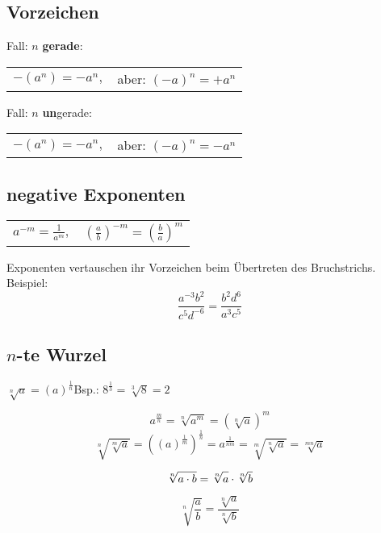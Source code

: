 \begin{multicols}{2}
\subsection*{Vorzeichen}
Fall: $n$ \textbf{gerade}:

\begin{tabular}{cc}
 $-(a^n) = -a^n,$ & aber: $(-a)^n = +a^n$
 \end{tabular} 

Fall: $n$ \textbf{un}gerade:

\begin{tabular}{cc}
 $-(a^n) = -a^n,$ & aber: $(-a)^n = -a^n$
 \end{tabular} 


\subsection*{negative Exponenten}


\begin{tabular}{cc}
$a^{-m} = \frac1{a^m},$ & $\left(\frac{a}b\right)^{-m} = \left(\frac{b}a\right)^m$
 \end{tabular}

Exponenten vertauschen ihr Vorzeichen beim Übertreten des
Bruchstrichs. Beispiel:
$$\frac{a^{-3}b^2}{c^5d^{-6}} = \frac{b^2d^6}{a^3c^5}$$


\subsection*{$n$-te Wurzel}
$\sqrt[n]{a} = \left(a\right)^\frac1n$\hfill{}Bsp.: $8^{\frac13}=\sqrt[3]{8}=2$

\begin{tcolorbox}[colback=white]
$$a^{\frac{m}n} = \sqrt[n]{a^m} = \left(\sqrt[n]a\right)^m$$
$$\sqrt[n]{\sqrt[m]{a}}   = \left((a)^\frac1m \right)^\frac1n =
  a^\frac1{nm} = \sqrt[m]{\sqrt[n]{a}}   = \sqrt[mn]{a}$$

  $$\sqrt[n]{a\cdot{}b} = \sqrt[n]{\vphantom{b}a} \cdot \sqrt[n]b$$

  $$\sqrt[n]{\frac{a}{b}} = \frac{\sqrt[n]a}{\sqrt[n]b}$$
\end{tcolorbox}

 
\hrulefill

\end{multicols}
